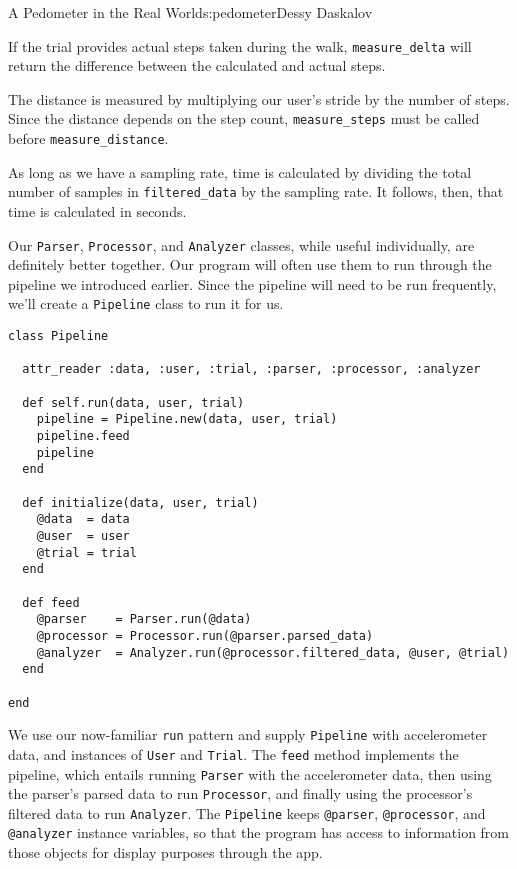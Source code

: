 \begin{aosachapter}{A Pedometer in the Real World}{s:pedometer}{Dessy Daskalov}
\label{measureux5fdelta}

If the trial provides actual steps taken during the walk,
\texttt{measure\_delta} will return the difference between the
calculated and actual steps.

\label{measureux5fdistance}

The distance is measured by multiplying our user's stride by the number
of steps. Since the distance depends on the step count,
\texttt{measure\_steps} must be called before
\texttt{measure\_distance}.

\label{measureux5ftime}

As long as we have a sampling rate, time is calculated by dividing the
total number of samples in \texttt{filtered\_data} by the sampling rate.
It follows, then, that time is calculated in seconds.

\label{tying-it-all-together-with-the-pipeline}

Our \texttt{Parser}, \texttt{Processor}, and \texttt{Analyzer} classes,
while useful individually, are definitely better together. Our program
will often use them to run through the pipeline we introduced earlier.
Since the pipeline will need to be run frequently, we'll create a
\texttt{Pipeline} class to run it for us.

\begin{verbatim}
class Pipeline

  attr_reader :data, :user, :trial, :parser, :processor, :analyzer

  def self.run(data, user, trial)
    pipeline = Pipeline.new(data, user, trial)
    pipeline.feed
    pipeline
  end

  def initialize(data, user, trial)
    @data  = data
    @user  = user
    @trial = trial
  end

  def feed
    @parser    = Parser.run(@data)
    @processor = Processor.run(@parser.parsed_data)
    @analyzer  = Analyzer.run(@processor.filtered_data, @user, @trial)
  end

end
\end{verbatim}

We use our now-familiar \texttt{run} pattern and supply
\texttt{Pipeline} with accelerometer data, and instances of
\texttt{User} and \texttt{Trial}. The \texttt{feed} method implements
the pipeline, which entails running \texttt{Parser} with the
accelerometer data, then using the parser's parsed data to run
\texttt{Processor}, and finally using the processor's filtered data to
run \texttt{Analyzer}. The \texttt{Pipeline} keeps \texttt{@parser},
\texttt{@processor}, and \texttt{@analyzer} instance variables, so that
the program has access to information from those objects for display
purposes through the app.


\end{aosachapter}
